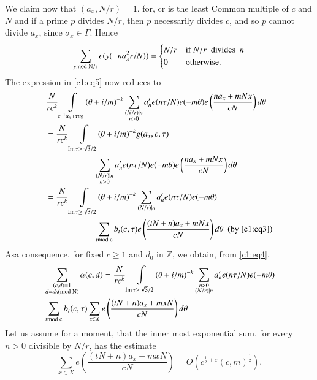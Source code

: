 We claim now that $(a_{x},N/r)=1$. for, $\text{cr}$ is the least
Common multiple of $c$ and $N$ and if a prime $p$ divides $N/r$, then
$p$ necessarily divides $c$, and so $p$ cannot divide $a_{x}$, since
$\sigma_{x}\in\Gamma$. Hence
$$
\sum_{y\rm{mod} \; N/r}e(y(-na^{2}_{x}r/N))=
\begin{cases}
N/r & \text{if } N/r \text{ \ divides \ }n\\
0 & \text{otherwise.}
\end{cases}
$$
The expression in \eqref{c1:eq5} now reduces to
\begin{align*}
& \frac{N}{rc^{k}}\int\limits_{c^{-1}a_{x}+\tau
    \varepsilon \mathfrak{g}}(\theta+i/m)^{-k}\sum_{\substack{(N/r)|n\\ n>0}}a'_{n}e(n\tau/N)e(-m\theta)e\left(\frac{na_{x}+mNx}{cN}\right)d\theta\\
&= \frac{N}{rc^{k}}\int\limits_{\operatorname{Im}
    \tau\geq\sqrt{3}/2}(\theta+i/m)^{-k}g(a_{x},c,\tau)\\
&\hspace{2cm}\sum_{\substack{(N/r)|n\\ n>0}}a'_{n}e(n\tau/N)e(-m\theta)e\left(\frac{na_{x}+mNx}{cN}\right)d\theta\\
&= \frac{N}{rc^{k}}\int\limits_{\operatorname{Im}
    \tau\geq\sqrt{3}/2}(\theta+i/m)^{-k}\sum_{(N/r)|n}a'_{n}e(n\tau/N)e(-m\theta)\\
&\hspace{2cm}\sum_{t\rm{mod} \;
    c}b_{t}(c,\tau)e\left(\frac{(tN+n)a_{x}+mNx}{cN}\right)d\theta\text{
    \ (by \eqref{c1:eq3})}
\end{align*}
As\pageoriginale a consequence, for fixed $c\geq 1$ and $d_{0}$ in
$\mathbb{Z}$, we obtain, from \eqref{c1:eq4},
\begin{align*}
& \sum_{\substack{(c,d)=1\\ d\equiv d_{0}(\rm{mod} \;
      N)}}\alpha(c,d)=\frac{N}{rc^{k}}\int\limits_{\operatorname{Im} \tau\geq
      \sqrt{3}/2}(\theta+i/m)^{-k}\sum_{\substack{n>0\\ (N/r)|n}}a'_{n}e(n\tau/N)e(-m\theta)\\
&\sum_{t\rm{mod} \; c}b_{t}(c,\tau)\sum_{x\in
        X}e\left(\frac{(tN+n)a_{x}+mxN}{cN}\right)d\theta 
\end{align*}
Let us assume for a moment, that the inner most exponential sum, for
every $n>0$ divisible by $N/r$, has the estimate
\begin{equation*}
\sum_{x\in
  X}e\left(\frac{(tN+n)a_{x}+mxN}{cN}\right) =
O(c^{\frac{1}{2}+\varepsilon}(c,m)^{\frac{1}{2}}).\tag{6}\label{c1:eq6}  
\end{equation*}
